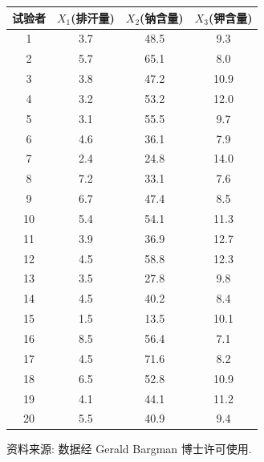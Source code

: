 \begin{mvtable}
\label{tab:5.1}
\begin{tabular}{cccc}
\toprule
试验者 & $X_1$(排汗量) & $X_2$(钠含量) & $X_3$(钾含量)\\
\midrule
1 & 3.7 & 48.5 & 9.3\\
2 & 5.7 & 65.1 & 8.0\\
3 & 3.8 & 47.2 & 10.9\\
4 & 3.2 & 53.2 & 12.0\\
5 & 3.1 & 55.5 & 9.7\\
6 & 4.6 & 36.1 & 7.9\\
7 & 2.4 & 24.8 & 14.0\\
8 & 7.2 & 33.1 & 7.6\\
9 & 6.7 & 47.4 & 8.5\\
10 & 5.4 & 54.1 & 11.3\\
11 & 3.9 & 36.9 & 12.7\\
12 & 4.5 & 58.8 & 12.3\\
13 & 3.5 & 27.8 & 9.8\\
14 & 4.5 & 40.2 & 8.4\\
15 & 1.5 & 13.5 & 10.1\\
16 & 8.5 & 56.4 & 7.1\\
17 & 4.5 & 71.6 & 8.2\\
18 & 6.5 & 52.8 & 10.9\\
19 & 4.1 & 44.1 & 11.2\\
20 & 5.5 & 40.9 & 9.4\\
\bottomrule
\end{tabular}
\end{mvtable}

资料来源: 数据经 Gerald Bargman 博士许可使用.
